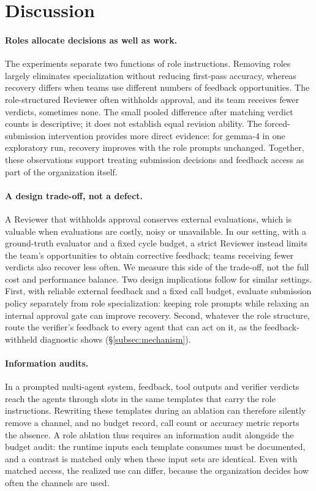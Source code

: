 \section{Discussion}
\label{sec:discussion}

\paragraph{Roles allocate decisions as well as work.} The experiments
separate two functions of role instructions. Removing roles largely
eliminates specialization without reducing first-pass accuracy, whereas
recovery differs when teams use different numbers of feedback opportunities.
The role-structured Reviewer often withholds approval, and its team receives
fewer verdicts, sometimes none. The small pooled difference after matching
verdict counts is descriptive; it does not establish equal revision ability.
The forced-submission intervention provides more direct evidence: for gemma-4
in one exploratory run, recovery improves with the role prompts unchanged.
Together, these observations support treating submission decisions and
feedback access as part of the organization itself.
\paragraph{A design trade-off, not a defect.} A Reviewer that withholds
approval conserves external evaluations, which is valuable when evaluations
are costly, noisy or unavailable. In our setting, with a ground-truth
evaluator and a fixed cycle budget, a strict Reviewer instead limits the
team's opportunities to obtain corrective feedback; teams receiving fewer
verdicts also recover less often. We measure this side of the trade-off, not the full cost
and performance balance. Two design implications follow for similar settings.
First, with reliable external feedback and a fixed call budget, evaluate
submission policy separately from role specialization: keeping role prompts
while relaxing an internal approval gate can improve recovery.
Second, whatever the role structure, route the verifier's feedback to every
agent that can act on it, as the feedback-withheld diagnostic shows
(\S\ref{subsec:mechanism}).

\paragraph{Information audits.} In a prompted multi-agent system, feedback,
tool outputs and verifier verdicts reach the agents through slots in the
same templates that carry the role instructions. Rewriting these templates
during an ablation can therefore silently remove a channel, and no budget
record, call count or accuracy metric reports the absence. A role ablation
thus requires an information audit alongside the budget audit: the runtime
inputs each template consumes must be documented, and a contrast is matched
only when these input sets are identical. Even with matched access, the
realized use can differ, because the organization decides how often the
channels are used.

